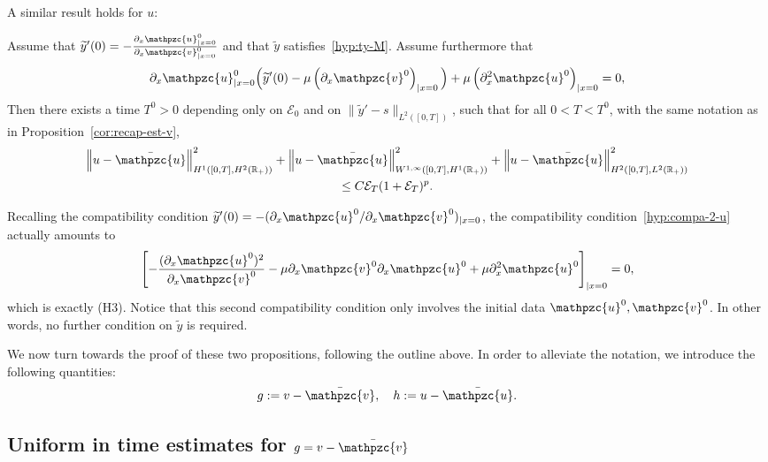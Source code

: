 \documentclass[AHL,Unicode,longabstracts,published]{cedram}
\newcommand{\R}{\mathbb{R}}
\newcommand{\p}{\partial}
\newcommand{\bv}{\bar{\mathpzc{v}}}
\newcommand{\bu}{\bar{\mathpzc{u}}}
\newcommand{\cE}{\mathcal E}
\newcommand{\tv}{\mathpzc{v}}
\newcommand{\tu}{\mathpzc{u}}
\newcommand{\ty}{\widetilde{y}}
\begin{document}
A similar result holds for $u$:
\begin{prop}\label{prop:est-u}
Assume that $\ty'(0)=-\frac{\p_x \tu^0_{|x=0}}{\p_x \tv^0_{|x=0}}$ and that $\ty$ satisfies~\eqref{hyp:ty-M}. Assume furthermore that
\begin{equation}\label{hyp:compa-2-u}
\partial_x \tu^0_{|x=0}\Big(\ty'(0) -\mu \left(\partial_x \tv^0\right)_{|x=0} \Big) + \mu \left(\partial^2_x \tu^0\right)_{|x=0} = 0,
\end{equation}
Then there exists a time $T^0>0$ depending only on $\cE_0$ and on $\|\ty'-s\|_{L^2([0,T])}$, such that for all $0<T<T^0$, with the same notation as in Proposition~\ref{cor:recap-est-v},
\begin{multline*}
\left\|u-\bu\right\|_{H^1\left([0,T], H^2(\R_+)\right)}^2 + \left\|u-\bu\right\|_{W^{1,\infty}\left([0,T], H^1(\R_+)\right)}^2 + \left\|u-\bu\right\|_{H^2\left([0,T], L^2(\R_+)\right)}^2\\
\leq C \cE_T (1+ \cE_T)^p.
\end{multline*}
\end{prop}

\begin{rema}
Recalling the compatibility condition $\ty'(0)=-(\p_x \tu^0/\p_x \tv^0)_{|x=0}$, the compatibility condition~\eqref{hyp:compa-2-u} actually amounts to
\[
\left[-\frac{(\p_x \tu^0)^2}{\p_x \tv^0} - \mu \p_x \tv^0 \p_x \tu^0 + \mu \p_x^2 \tu^0\right]_{|x=0}=0,
\]
which is exactly (H3). Notice that this second compatibility condition only involves the initial data $\tu^0, \tv^0$. In other words, no further condition on $\ty$ is required.
\end{rema}



We now turn towards the proof of these two propositions, following the outline above. In order to alleviate the notation, we introduce the following quantities:
\[
g:=v-\bv,\quad h:=u-\bu.
\]

\subsection{Uniform in time estimates for \texorpdfstring{$g=v-\bv$}{g}}\label{sec:unif-est-g}
\end{document}
